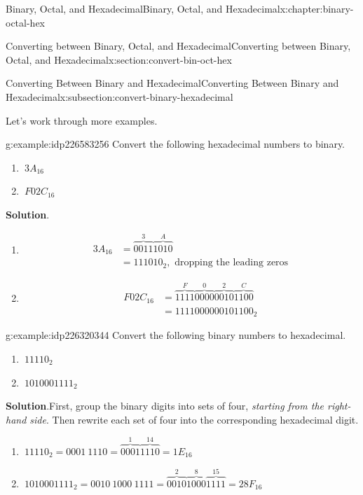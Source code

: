 \documentclass[twoside,10pt,]{book}
\newcommand{\blocktitlefont}{\relax}
\numberwithin{equation}{section}
\newcommand{\amp}{&}
\begin{document}
\begin{chapterptx}{Binary, Octal, and Hexadecimal}{}{Binary, Octal, and Hexadecimal}{}{}{x:chapter:binary-octal-hex}
\begin{sectionptx}{Converting between Binary, Octal, and Hexadecimal}{}{Converting between Binary, Octal, and Hexadecimal}{}{}{x:section:convert-bin-oct-hex}
\begin{subsectionptx}{Converting Between Binary and Hexadecimal}{}{Converting Between Binary and Hexadecimal}{}{}{x:subsection:convert-binary-hexadecimal}
%
\par
Let's work through more examples.%
\begin{example}{}{g:example:idp226583256}%
Convert the following hexadecimal numbers to binary. %
%
\begin{enumerate}
\item{}\(\displaystyle \ 3A_{16}\)%
\item{}\(\displaystyle \ F02C_{16}\)%
\end{enumerate}
\par\smallskip%
\noindent\textbf{\blocktitlefont Solution}.\label{g:solution:idp226322776}{}\hypertarget{g:solution:idp226322776}{}\quad{}%
\begin{enumerate}
\item{}%
\begin{align*}
3A_{16} \amp = \overbrace{0011}^3\overbrace{1010}^A\\
\amp = 111010_2,\text{ dropping the leading zeros}
\end{align*}
%
\item{}%
\begin{align*}
F02C_{16} \amp = \overbrace{1111}^F\overbrace{0000}^0\overbrace{0010}^2\overbrace{1100}^C\\
\amp = 1111000000101100_2
\end{align*}
%
\end{enumerate}
\end{example}
\begin{example}{}{g:example:idp226320344}%
Convert the following binary numbers to hexadecimal. %
\begin{enumerate}
\item{}\(\displaystyle \ 11110_2\)%
\item{}\(\displaystyle \ 1010001111_2\)%
\end{enumerate}
\par\smallskip%
\noindent\textbf{\blocktitlefont Solution}.\label{g:solution:idp226321624}{}\hypertarget{g:solution:idp226321624}{}\quad{}First, group the binary digits into sets of four, \emph{starting from the right-hand side}.  Then rewrite each set of four into the corresponding hexadecimal digit. %
\begin{enumerate}
\item{}\(\displaystyle \ 11110_2 = 0001\ 1110 = \overbrace{0001}^1\overbrace{1110}^{14}=1E_{16}\)%
\item{}\(\displaystyle \ 1010001111_2 = 0010\ 1000\ 1111=\overbrace{0010}^2\overbrace{1000}^8\overbrace{1111}^{15}=28F_{16}\)%

\end{enumerate}
\end{example}
\end{subsectionptx}
\end{sectionptx}
\end{chapterptx}
\end{document}
